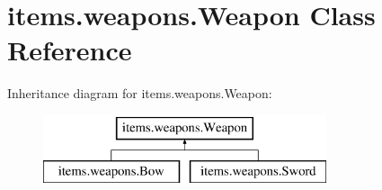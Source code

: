 \hypertarget{classitems_1_1weapons_1_1_weapon}{}\section{items.\+weapons.\+Weapon Class Reference}
\label{classitems_1_1weapons_1_1_weapon}
Inheritance diagram for items.\+weapons.\+Weapon\+:\begin{figure}[H]
\begin{center}
\leavevmode
\includegraphics[height=2.000000cm]{classitems_1_1weapons_1_1_weapon}
\end{center}
\end{figure}
